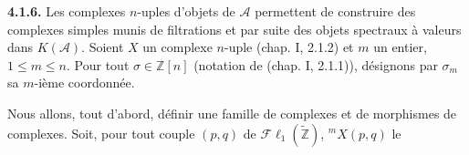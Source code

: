 \medskip\noindent\textbf{4.1.6.}\quad
Les complexes $n$-uples d'objets de $\mathcal A$ permettent de construire
des complexes simples munis de filtrations et par suite des objets spectraux
à valeurs dans $K(\mathcal A)$. Soient $X$ un complexe $n$-uple (chap. I,
2.1.2) et $m$ un entier, $1\leq m\leq n$. Pour tout
$\sigma\in\mathbb Z[n]$ (notation de (chap. I, 2.1.1)), désignons par
$\sigma_m$ sa $m$-ième coordonnée.

Nous allons, tout d'abord, définir une famille de complexes et de morphismes
de complexes. Soit, pour tout couple $(p,q)$ de
$\mathcal{F}\ell_1(\widetilde{\mathbb Z})$, ${}^{m}X(p,q)$ le
\endgroup
